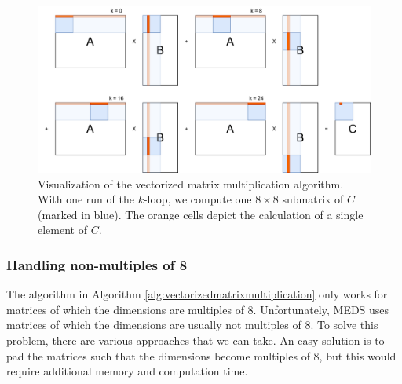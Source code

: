 \documentclass[11pt,a4paper]{report}
\theoremstyle{definition}
\begin{document}
\begin{figure}
  \centering
  \includegraphics[width=\textwidth]{matmul/parallel_matmul8.png}
  \caption{Visualization of the vectorized matrix multiplication algorithm. With one run of the $k$-loop, we compute one $8\times8$ submatrix of $C$ (marked in blue). The orange cells depict the calculation of a single element of $C$.}
  \label{fig:vectorizedmatrixmultiplication}
\end{figure}

\subsubsection{Handling non-multiples of 8}
The algorithm in Algorithm \ref{alg:vectorizedmatrixmultiplication} only works for matrices of which the dimensions are multiples of 8. Unfortunately, MEDS uses matrices of which the dimensions are usually not multiples of 8. To solve this problem, there are various approaches that we can take. An easy solution is to pad the matrices such that the dimensions become multiples of 8, but this would require additional memory and computation time.
\end{document}
